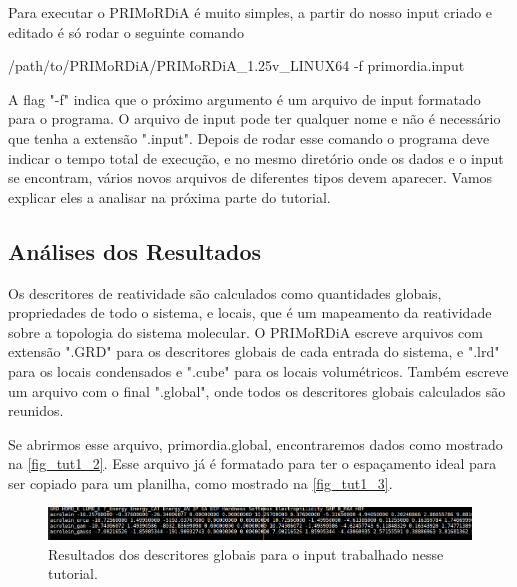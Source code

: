 \documentclass[a4paper,11pt]{refart}
\begin{document}
Para executar o PRIMoRDiA é muito simples, a partir do nosso input criado e editado é só rodar o seguinte comando

\hspace*{-\leftmarginwidth}
\begin{minipage}{\fullwidth}
\begin{commandshell}/path/to/PRIMoRDiA/PRIMoRDiA_1.25v_LINUX64 -f primordia.input\end{commandshell}
\end{minipage}

A flag "-f" indica que o próximo argumento é um arquivo de input formatado para o programa. O arquivo de input pode ter qualquer nome e não é necessário que tenha a extensão ".input". Depois de rodar esse comando o programa deve indicar o tempo total de execução, e no mesmo diretório onde os dados e o input se encontram, vários novos arquivos de diferentes tipos devem aparecer. Vamos explicar eles a analisar na próxima parte do tutorial.


\subsection{Análises dos Resultados}

Os descritores de reatividade são calculados como quantidades globais, propriedades de todo o sistema, e locais, que é um mapeamento da reatividade sobre a topologia do sistema molecular. O PRIMoRDiA escreve arquivos com extensão ".GRD" para os descritores globais de cada entrada do sistema, e ".lrd" para os locais condensados e ".cube" para os locais volumétricos. Também escreve um arquivo com o final ".global", onde todos os descritores globais calculados são reunidos.

Se abrirmos esse arquivo, primordia.global, encontraremos dados como mostrado na \autoref{fig_tut1_2}. Esse arquivo já é formatado para ter o espaçamento ideal para ser copiado para um planilha, como mostrado na \autoref{fig_tut1_3}.


\hspace*{-1.2\leftmarginwidth}
\begin{minipage}{\fullwidth}
	\begin{figure}[H]
		\begin{center}
			\includegraphics[width=7in]{images/img3}
			\caption{Resultados dos descritores globais para o input trabalhado nesse tutorial.}
			\label{fig_tut1_2}
		\end{center}
	\end{figure}
\end{minipage}	
\end{document}
